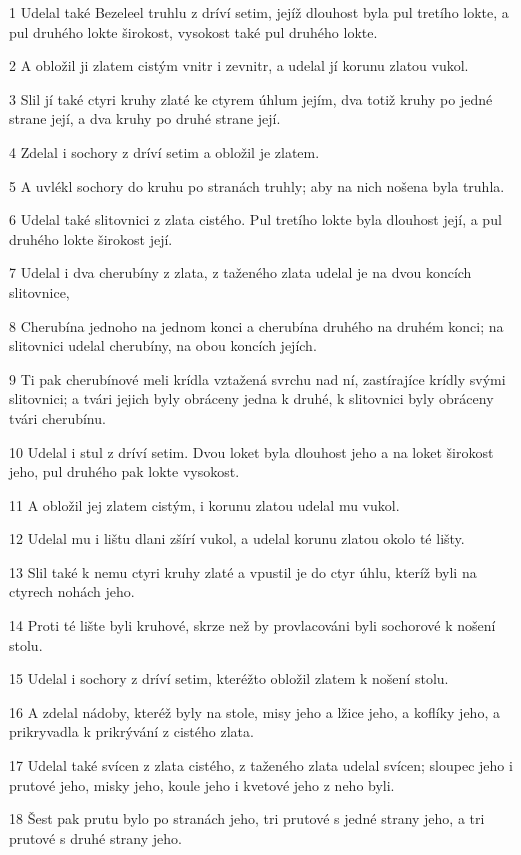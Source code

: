 \par 1 Udelal také Bezeleel truhlu z dríví setim, jejíž dlouhost byla pul tretího lokte, a pul druhého lokte širokost, vysokost také pul druhého lokte.
\par 2 A obložil ji zlatem cistým vnitr i zevnitr, a udelal jí korunu zlatou vukol.
\par 3 Slil jí také ctyri kruhy zlaté ke ctyrem úhlum jejím, dva totiž kruhy po jedné strane její, a dva kruhy po druhé strane její.
\par 4 Zdelal i sochory z dríví setim a obložil je zlatem.
\par 5 A uvlékl sochory do kruhu po stranách truhly; aby na nich nošena byla truhla.
\par 6 Udelal také slitovnici z zlata cistého. Pul tretího lokte byla dlouhost její, a pul druhého lokte širokost její.
\par 7 Udelal i dva cherubíny z zlata, z taženého zlata udelal je na dvou koncích slitovnice,
\par 8 Cherubína jednoho na jednom konci a cherubína druhého na druhém konci; na slitovnici udelal cherubíny, na obou koncích jejích.
\par 9 Ti pak cherubínové meli krídla vztažená svrchu nad ní, zastírajíce krídly svými slitovnici; a tvári jejich byly obráceny jedna k druhé, k slitovnici byly obráceny tvári cherubínu.
\par 10 Udelal i stul z dríví setim. Dvou loket byla dlouhost jeho a na loket širokost jeho, pul druhého pak lokte vysokost.
\par 11 A obložil jej zlatem cistým, i korunu zlatou udelal mu vukol.
\par 12 Udelal mu i lištu dlani zšírí vukol, a udelal korunu zlatou okolo té lišty.
\par 13 Slil také k nemu ctyri kruhy zlaté a vpustil je do ctyr úhlu, kteríž byli na ctyrech nohách jeho.
\par 14 Proti té lište byli kruhové, skrze než by provlacováni byli sochorové k nošení stolu.
\par 15 Udelal i sochory z dríví setim, kteréžto obložil zlatem k nošení stolu.
\par 16 A zdelal nádoby, kteréž byly na stole, misy jeho a lžice jeho, a koflíky jeho, a prikryvadla k prikrývání z cistého zlata.
\par 17 Udelal také svícen z zlata cistého, z taženého zlata udelal svícen; sloupec jeho i prutové jeho, misky jeho, koule jeho i kvetové jeho z neho byli.
\par 18 Šest pak prutu bylo po stranách jeho, tri prutové s jedné strany jeho, a tri prutové s druhé strany jeho.

